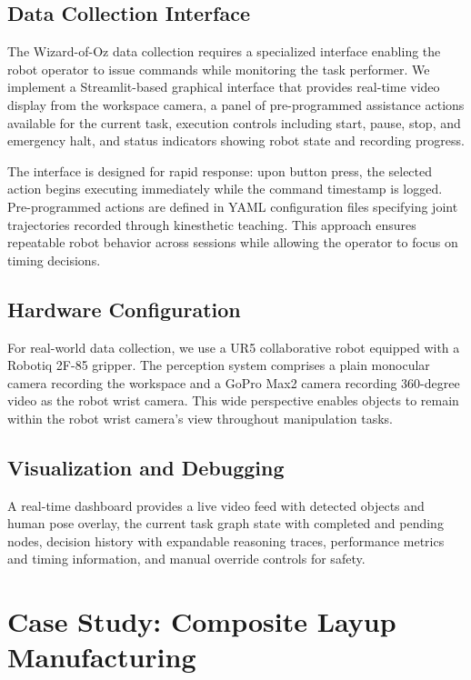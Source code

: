 \subsection{Data Collection Interface}

The Wizard-of-Oz data collection requires a specialized interface enabling the robot operator to issue commands while monitoring the task performer. We implement a Streamlit-based graphical interface that provides real-time video display from the workspace camera, a panel of pre-programmed assistance actions available for the current task, execution controls including start, pause, stop, and emergency halt, and status indicators showing robot state and recording progress.

The interface is designed for rapid response: upon button press, the selected action begins executing immediately while the command timestamp is logged. Pre-programmed actions are defined in YAML configuration files specifying joint trajectories recorded through kinesthetic teaching. This approach ensures repeatable robot behavior across sessions while allowing the operator to focus on timing decisions.

\subsection{Hardware Configuration}

For real-world data collection, we use a UR5 collaborative robot equipped with a Robotiq 2F-85 gripper. The perception system comprises a plain monocular camera recording the workspace and a GoPro Max2 camera recording 360-degree video as the robot wrist camera. This wide perspective enables objects to remain within the robot wrist camera's view throughout manipulation tasks.

\subsection{Visualization and Debugging}

A real-time dashboard provides a live video feed with detected objects and human pose overlay, the current task graph state with completed and pending nodes, decision history with expandable reasoning traces, performance metrics and timing information, and manual override controls for safety.

\section{Case Study: Composite Layup Manufacturing}
\label{sec:case_study}

